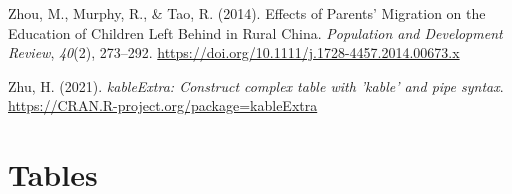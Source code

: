 \documentclass[
  man,floatsintext]{apa7}
\newlength{\cslhangindent}
\newlength{\cslentryspacingunit} %
\newenvironment{CSLReferences}[2] %
 {%
  \setlength{\parindent}{0pt}
  \ifodd #1
  \let\oldpar\par
  \def\par{\hangindent=\cslhangindent\oldpar}
  \fi
  \setlength{\parskip}{#2\cslentryspacingunit}
 }%
 {}
\begin{document}
\begin{CSLReferences}{1}{0}
\leavevmode{}%
Zhou, M., Murphy, R., \& Tao, R. (2014). Effects of Parents' Migration on the Education of Children Left Behind in Rural {China}. \emph{Population and Development Review}, \emph{40}(2), 273--292. \url{https://doi.org/10.1111/j.1728-4457.2014.00673.x}

\leavevmode{}%
Zhu, H. (2021). \emph{kableExtra: Construct complex table with 'kable' and pipe syntax}. \url{https://CRAN.R-project.org/package=kableExtra}

\end{CSLReferences}

\newpage

\hypertarget{appendix-the-appendix}{%
\appendix}


\hypertarget{tables}{%
\section{Tables}\label{tables}}
\end{document}
